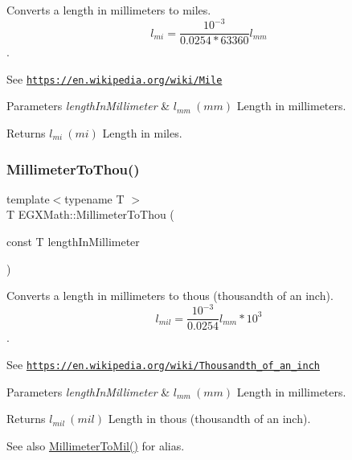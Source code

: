Converts a length in millimeters to miles. \[ l_{mi}=\frac{10^{-3}}{0.0254 * 63360} l_{mm} \]. 

See \href{https://en.wikipedia.org/wiki/Mile}{\tt https\+://en.\+wikipedia.\+org/wiki/\+Mile} 
\begin{DoxyParams}{Parameters}
{\em length\+In\+Millimeter} & $ l_{mm}\ (mm)$ Length in millimeters. \\
\hline
\end{DoxyParams}
\begin{DoxyReturn}{Returns}
$ l_{mi}\ (mi)$ Length in miles. 
\end{DoxyReturn}
\mbox{\label{group___e_g_x_math-_conversions-_length_conversions-_s_i-_millimeter-_imperial_ga099bde3b0f85fbbfbe91f0162a392835}} 
\subsubsection{\texorpdfstring{Millimeter\+To\+Thou()}{MillimeterToThou()}}
{\footnotesize\ttfamily template$<$typename T $>$ \\
T E\+G\+X\+Math\+::\+Millimeter\+To\+Thou (\begin{DoxyParamCaption}\item[{const T}]{length\+In\+Millimeter }\end{DoxyParamCaption})}



Converts a length in millimeters to thous (thousandth of an inch). \[ l_{mil}= \frac{10^{-3}}{0.0254} l_{mm} * 10^{3} \]. 

See \href{https://en.wikipedia.org/wiki/Thousandth_of_an_inch}{\tt https\+://en.\+wikipedia.\+org/wiki/\+Thousandth\+\_\+of\+\_\+an\+\_\+inch} 
\begin{DoxyParams}{Parameters}
{\em length\+In\+Millimeter} & $ l_{mm}\ (mm)$ Length in millimeters. \\
\hline
\end{DoxyParams}
\begin{DoxyReturn}{Returns}
$ l_{mil}\ (mil)$ Length in thous (thousandth of an inch). 
\end{DoxyReturn}
\begin{DoxySeeAlso}{See also}
\mbox{\hyperlink{group___e_g_x_math-_conversions-_length_conversions-_s_i-_millimeter-_imperial_gaf811317f4ce575df4ff0329491e92fac}{Millimeter\+To\+Mil()}} for alias. 
\end{DoxySeeAlso}
\mbox{\label{group___e_g_x_math-_conversions-_length_conversions-_s_i-_millimeter-_imperial_gae1b144c2bc56f6591e0ee9b37f0653fa}} 
